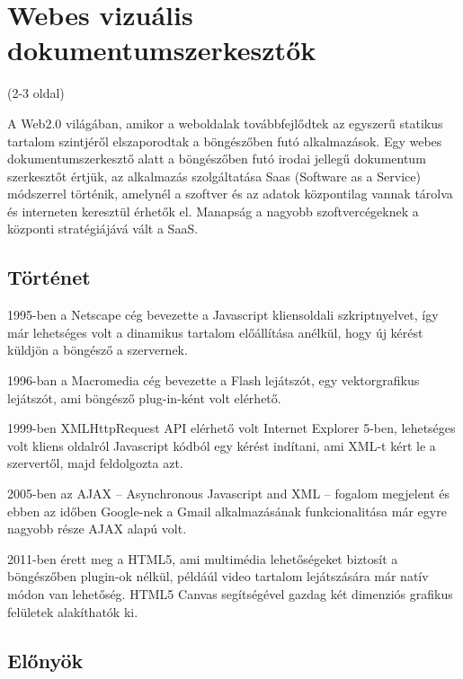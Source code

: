 \chapter{Webes vizuális dokumentumszerkesztők}
(2-3 oldal) 

A Web2.0 világában, amikor a weboldalak továbbfejlődtek az egyszerű statikus tartalom szintjéről elszaporodtak a böngészőben futó alkalmazások. Egy webes dokumentumszerkesztő alatt a böngészőben futó irodai jellegű dokumentum szerkesztőt értjük, az alkalmazás szolgáltatása Saas (Software as a Service) módszerrel történik, amelynél a szoftver és az adatok központilag vannak tárolva és interneten keresztül érhetők el. Manapság a nagyobb szoftvercégeknek a központi stratégiájává vált a SaaS. 

\section{Történet}

1995-ben a Netscape cég bevezette a Javascript kliensoldali szkriptnyelvet, így már lehetséges volt a dinamikus tartalom előállítása anélkül, hogy új kérést küldjön a böngésző a szervernek.

1996-ban a Macromedia cég bevezette a Flash lejátszót, egy vektorgrafikus lejátszót, ami böngésző plug-in-ként volt elérhető.

1999-ben XMLHttpRequest API elérhető volt Internet Explorer 5-ben, lehetséges volt kliens oldalról Javascript kódból egy kérést indítani, ami XML-t kért le a szervertől, majd feldolgozta azt.

2005-ben az AJAX -- Asynchronous Javascript and XML -- fogalom megjelent  és ebben az időben Google-nek a Gmail alkalmazásának  funkcionalitása már egyre nagyobb része AJAX alapú volt.

2011-ben érett meg a HTML5, ami multimédia lehetőségeket biztosít a böngészőben plugin-ok nélkül, példáúl video tartalom lejátszására már natív módon van lehetőség. HTML5 Canvas segítségével gazdag két dimenziós grafikus felületek alakíthatók ki. 

\section{Előnyök}

